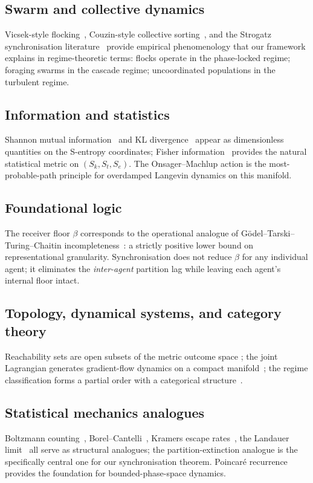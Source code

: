 \documentclass[11pt,twocolumn,a4paper]{article}
\newcommand{\Sk}{S_k}
\newcommand{\St}{S_t}
\newcommand{\Se}{S_e}
\begin{document}
\subsection{Swarm and collective dynamics}
Vicsek-style flocking~\cite{vicsek1995}, Couzin-style collective
sorting~\cite{couzin2002}, and the Strogatz synchronisation
literature~\cite{strogatz2000,strogatz2003} provide empirical
phenomenology that our framework explains in regime-theoretic terms:
flocks operate in the phase-locked regime; foraging swarms in the
cascade regime; uncoordinated populations in the turbulent regime.

\subsection{Information and statistics}
Shannon mutual information~\cite{shannon1948,coverthomas2006} and
KL divergence~\cite{kullback1951} appear as dimensionless quantities
on the S-entropy coordinates; Fisher information~\cite{fisher1925}
provides the natural statistical metric on $(\Sk,\St,\Se)$. The
Onsager--Machlup action is the most-probable-path principle for
overdamped Langevin dynamics on this manifold.

\subsection{Foundational logic}
The receiver floor $\beta$ corresponds to the operational analogue
of Gödel--Tarski--Turing--Chaitin
incompleteness~\cite{godel1931,tarski1933,turing1936,chaitin1974}:
a strictly positive lower bound on representational granularity.
Synchronisation does not reduce $\beta$ for any individual agent; it
eliminates the \emph{inter-agent} partition lag while leaving each
agent's internal floor intact.

\subsection{Topology, dynamical systems, and category theory}
Reachability sets are open subsets of the metric outcome space
\cite{kelley1955,munkres2000}; the joint Lagrangian generates
gradient-flow dynamics on a compact manifold~\cite{khalil2002,
teschl2012,nakahara2003}; the regime classification forms a partial
order with a categorical structure~\cite{maclane1998,birkhoff1967,
awodey2010,barrwells1990,howie1995}.

\subsection{Statistical mechanics analogues}
Boltzmann counting~\cite{boltzmann1877}, Borel--Cantelli~\cite{
borel1909,cantelli1917}, Kramers escape rates~\cite{kramers1940},
the Landauer limit~\cite{landauer1961,bennett1973} all serve as
structural analogues; the partition-extinction analogue
\cite{onnes1911,bardeen1957,cooper1956,landau1941} is the
specifically central one for our synchronisation theorem.
Poincaré recurrence~\cite{poincare1890} provides the
foundation for bounded-phase-space dynamics.
\end{document}
